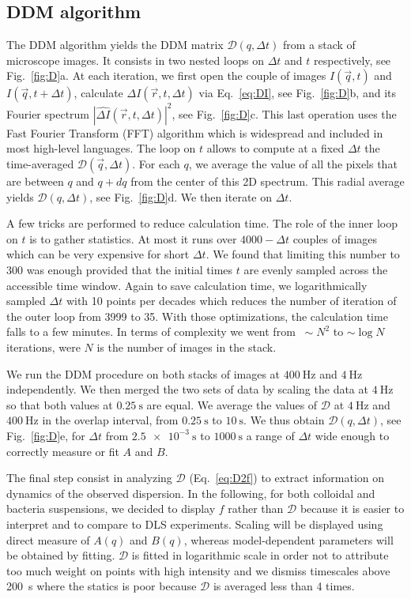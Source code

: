 \documentclass[prb,reprint,amsmath,amssymb]{revtex4-1}
\newcommand{\tg}[1]{{\color{magenta}#1}} %
\begin{document}
\subsection{DDM algorithm}
\label{sec:ddmalgo}

\tg{The DDM algorithm yields the DDM matrix $\mathcal{D}(q,\Delta t)$ from a stack of microscope images. It consists in two nested loops on $\Delta t$ and $t$ respectively, see Fig.~\ref{fig:D}a. At each iteration, we first open the couple of images $I(\vec{q},t)$ and $I(\vec{q},t+\Delta t)$, calculate $\Delta I(\vec{r},t, \Delta t)$ via Eq.~\eqref{eq:DI}, see Fig.~\ref{fig:D}b, and its Fourier spectrum $\left|\widehat{\Delta I}(\vec{r},t, \Delta t)\right|^2$, see Fig.~\ref{fig:D}c. This last operation uses the Fast Fourier Transform (FFT) algorithm which is widespread and included in most high-level languages. The loop on $t$ allows to compute at a fixed $\Delta t$ the time-averaged $\mathcal{D}(\vec{q}, \Delta t)$. For each $q$, we average the value of all the pixels that are between $q$ and $q+dq$ from the center of this 2D spectrum. This radial average yields $\mathcal{D}(q, \Delta t)$, see Fig.~\ref{fig:D}d. We then iterate on $\Delta t$.

A few tricks are performed to reduce calculation time. The role of the inner loop on $t$ is to gather statistics. At most it runs over $4000-\Delta t$ couples of images which can be very expensive for short $\Delta t$. We found that limiting this number to 300 was enough provided that the initial times $t$ are evenly sampled across the accessible time window. Again to save calculation time, we logarithmically sampled $\Delta t$ with 10 points per decades which reduces the number of iteration of the outer loop from 3999 to 35. With those optimizations, the calculation time falls to a few minutes. In terms of complexity we went from $~\sim N^2$ to $\sim \log N$ iterations, were $N$ is the number of images in the stack.

We run the DDM procedure on both stacks of images at $\SI{400}{\hertz}$ and $\SI{4}{\hertz}$ independently. We then merged the two sets of data by scaling the data at $\SI{4}{\hertz}$ so that both values at $\SI{0.25}{\second}$ are equal. We average the values of $\mathcal{D}$ at $\SI{4}{\hertz}$ and $\SI{400}{\hertz}$ in the overlap interval, from $\SI{0.25}{\second}$ to $\SI{10}{\second}$. We thus obtain $\mathcal{D} (q, \Delta t)$, see Fig.~\ref{fig:D}e, for $\Delta t$ from $\SI{2.5e-3}{\second}$ to $\SI{1000}{\second}$ a range of $\Delta t$ wide enough to correctly measure or fit $A$ and $B$.

The final step consist in analyzing $\mathcal{D}$ (Eq.~\ref{eq:D2f}) to extract information on dynamics of the observed dispersion. In the following, for both colloidal and bacteria suspensions, we decided to display $f$ rather than $\mathcal{D}$ because it is easier to interpret and to compare to DLS experiments. Scaling will be displayed using direct measure of $A(q)$ and $B(q)$, whereas model-dependent parameters will be obtained by fitting. $\mathcal{D}$ is fitted in logarithmic scale in order not to attribute too much weight on points with high intensity and we dismiss timescales above \SI{200}{\second} where the statics is poor because $\mathcal{D}$ is averaged less than 4 times.}
\end{document}
